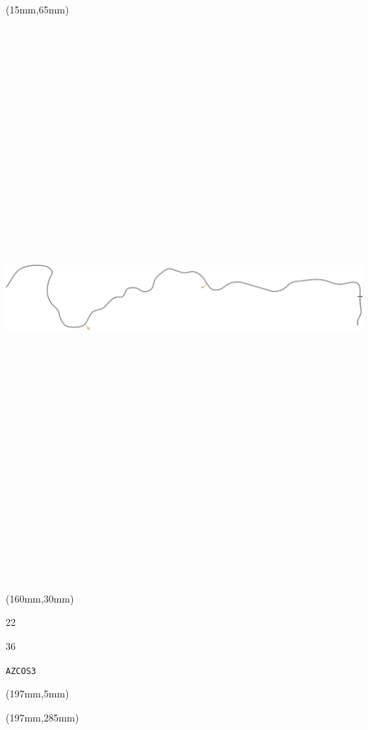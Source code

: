 \begin{textblock*}{185mm}(15mm,65mm)%
\centering
\mbox{\includegraphics[width=185mm,height=210mm,keepaspectratio]{PT/AZCOS3.pdf}}
\end{textblock*}
\begin{textblock*}{40mm}(160mm,30mm)%
\Large
\par{} 
\par22 
\par36 
\par\hfill\tiny\tt AZCOS3\\
\end{textblock*}
\begin{textblock*}{20mm}(197mm,5mm)%
\fbox{\thepage}
\label{AZCOS3}
\end{textblock*}
\begin{textblock*}{20mm}(197mm,285mm)%
\fbox{\thepage}
\end{textblock*}

